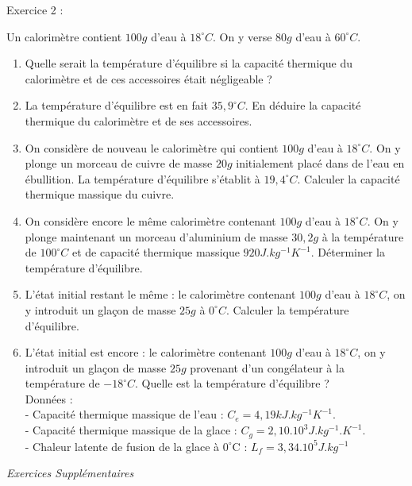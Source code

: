 \documentclass[12pt, french]{article}
\begin{document}
\begin{Box2}{Exercice 2 : }

  Un calorimètre contient $100 g$ d’eau à $18^{\circ}C$. On y verse $80 g$ d’eau à $60^{\circ}C$.
  \begin{enumerate}
    \item Quelle serait la température d'équilibre si la capacité thermique du calorimètre et de ces accessoires était
négligeable ?
\item La température d’équilibre est en fait $35,9^{\circ}C$. En déduire la capacité thermique du calorimètre et de ses
accessoires.
\item On considère de nouveau le calorimètre qui contient $100 g$ d’eau à $18^{\circ}C$. On y plonge un morceau de
cuivre de masse $20 g$ initialement placé dans de l’eau en ébullition. La température d'équilibre s’établit à
$19,4^{\circ}C$. Calculer la capacité thermique massique du cuivre.
\item  On considère encore le même calorimètre contenant $100 g$ d’eau à $18^{\circ}C$. On y plonge maintenant un
morceau d’aluminium de masse $30,2 g$ à la température de $100^{\circ}C$ et de capacité thermique massique $920J.kg^{-1}K^{-1}$.
Déterminer la température d'équilibre.
\item  L’état initial restant le même : le calorimètre contenant $100 g$ d’eau à $18^{\circ}C$, on y introduit un glaçon de
masse $25 g$ à $0^{\circ}C$. Calculer la température d'équilibre.
\item  L’état initial est encore : le calorimètre contenant $100 g$ d’eau à $18^{\circ}C$, on y introduit un glaçon de masse
$25g$ provenant d’un congélateur à la température de $-18^{\circ}C$. Quelle est la température d’équilibre ?
\\Données :
\\- Capacité thermique massique de l’eau : $C_e = 4,19 kJ.kg^{-1}K^{-1}$.
\\- Capacité thermique massique de la glace : $C_g = 2,10.10^3 J.kg^{-1}.K^{-1}$.
      \\- Chaleur latente de fusion de la glace à $0^{\circ}$C : $L_f = 3,34.10^5 J.kg^{-1}$
\end{enumerate}
\end{Box2}

\vspace{2cm}
\begin{center}
   \Large{ \em{Exercices Supplémentaires}}
\end{center}
\end{document}
